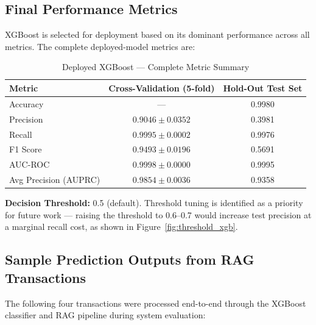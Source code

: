 \documentclass[12pt,a4paper]{article}
\begin{document}
\label{sec:deployed}

\subsection{Final Performance Metrics}

XGBoost is selected for deployment based on its dominant performance across all metrics. The complete deployed-model metrics are:

\begin{table}[H]
\centering
\caption{Deployed XGBoost --- Complete Metric Summary}
\label{tab:xgb_full}
\begin{tabular}{lcc}
\toprule
\textbf{Metric} & \textbf{Cross-Validation (5-fold)} & \textbf{Hold-Out Test Set} \\
\midrule
Accuracy & --- & 0.9980 \\
Precision & $0.9046 \pm 0.0352$ & 0.3981 \\
Recall & $0.9995 \pm 0.0002$ & 0.9976 \\
F1 Score & $0.9493 \pm 0.0196$ & 0.5691 \\
AUC-ROC & $0.9998 \pm 0.0000$ & 0.9995 \\
Avg Precision (AUPRC) & $0.9854 \pm 0.0036$ & 0.9358 \\
\bottomrule
\end{tabular}
\end{table}

\textbf{Decision Threshold:} 0.5 (default). Threshold tuning is identified as a priority for future work --- raising the threshold to 0.6--0.7 would increase test precision at a marginal recall cost, as shown in Figure~\ref{fig:threshold_xgb}.

\subsection{Sample Prediction Outputs from RAG Transactions}

The following four transactions were processed end-to-end through the XGBoost classifier and RAG pipeline during system evaluation:
\end{document}
